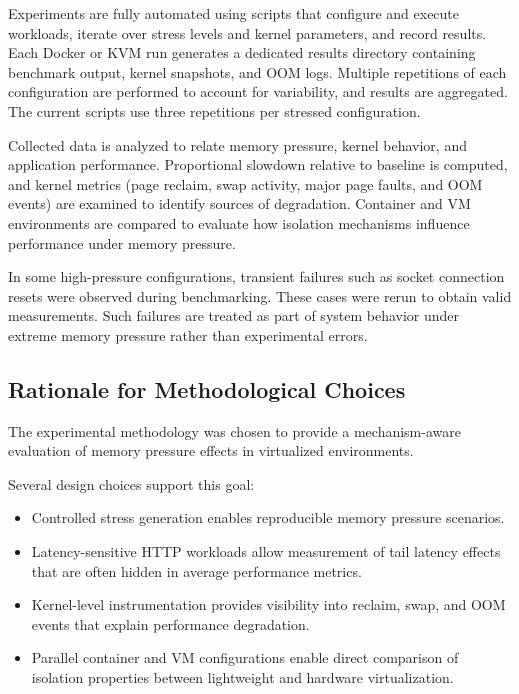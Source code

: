 \documentclass[conference]{IEEEtran}
\begin{document}
Experiments are fully automated using scripts that configure and execute workloads, iterate over stress levels and kernel parameters, and record results. Each Docker or KVM run generates a dedicated results directory containing benchmark output, kernel snapshots, and OOM logs. Multiple repetitions of each configuration are performed to account for variability, and results are aggregated. The current scripts use three repetitions per stressed configuration.

Collected data is analyzed to relate memory pressure, kernel behavior, and application performance. Proportional slowdown relative to baseline is computed, and kernel metrics (page reclaim, swap activity, major page faults, and OOM events) are examined to identify sources of degradation. Container and VM environments are compared to evaluate how isolation mechanisms influence performance under memory pressure.

In some high-pressure configurations, transient failures such as socket connection resets were observed during benchmarking. These cases were rerun to obtain valid measurements. Such failures are treated as part of system behavior under extreme memory pressure rather than experimental errors.

\subsection{Rationale for Methodological Choices}

The experimental methodology was chosen to provide a mechanism-aware evaluation of memory pressure effects in virtualized environments.

Several design choices support this goal:

\begin{itemize}
\item Controlled stress generation enables reproducible memory pressure scenarios.
\item Latency-sensitive HTTP workloads allow measurement of tail latency effects that are often hidden in average performance metrics.
\item Kernel-level instrumentation provides visibility into reclaim, swap, and OOM events that explain performance degradation.
\item Parallel container and VM configurations enable direct comparison of isolation properties between lightweight and hardware virtualization.
\end{itemize}
\end{document}
